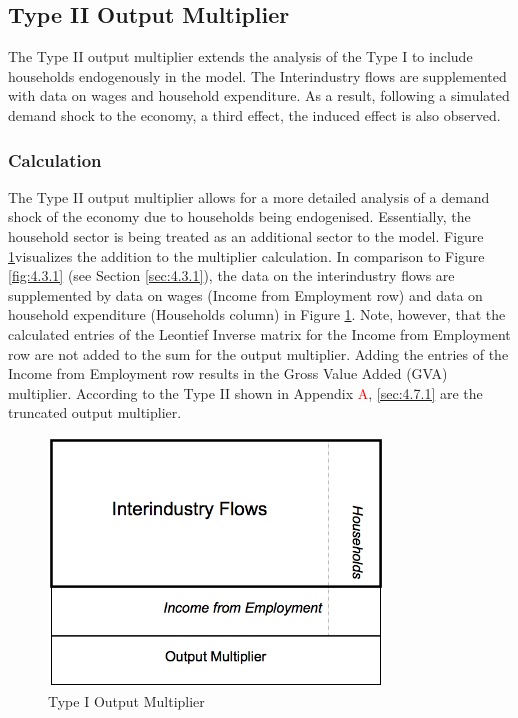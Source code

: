 \begin{doublespacing}
\subsection{Type II Output Multiplier}
\label{sec:4.3.2}

The Type II output multiplier extends the analysis of the Type I to include households endogenously in the model. The Interindustry flows are supplemented with data on wages and household expenditure. As a result, following a simulated demand shock to the economy, a third effect, the induced effect is also observed.

\subsubsection{Calculation}

The Type II output multiplier allows for a more detailed analysis of a demand shock of the economy due to households being endogenised. Essentially, the household sector is being treated as an additional sector to the model. Figure \ref{fig:4.3.2}visualizes the addition to the multiplier calculation. In comparison to Figure \ref{fig:4.3.1} (see Section \ref{sec:4.3.1}), the data on the interindustry flows are supplemented by data on wages (Income from Employment row) and data on household expenditure (Households column) in Figure \ref{fig:4.3.2}. Note, however, that the calculated entries of the Leontief Inverse matrix for the Income from Employment row are not added to the sum for the output multiplier. Adding the entries of the Income from Employment row results in the Gross Value Added (GVA) multiplier. According to  the Type II shown in Appendix \textcolor{red}A, \ref{sec:4.7.1} are the truncated output multiplier.

\bigskip
\begin{figure}[hb]
\label{fig:4.3.2}
  \centering
  \includegraphics[width=3.5in]{T2OutputMultiplier}
  \caption{Type I Output Multiplier}
\end{figure}
\bigskip


\end{doublespacing}
